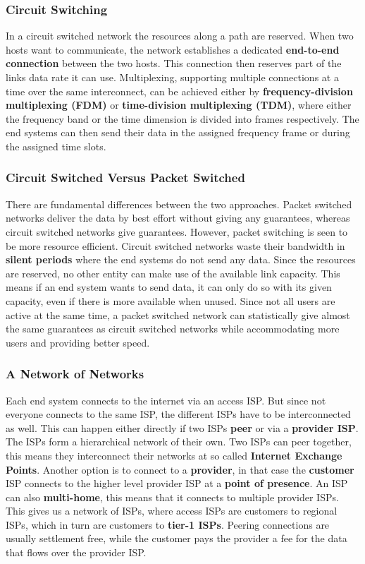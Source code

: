 \subsubsection{Circuit Switching}
In a circuit switched network the resources along a path are reserved. When two hosts want to communicate, the network establishes a dedicated \textbf{end-to-end connection} between the two hosts. This connection then reserves part of the links data rate it can use. Multiplexing, supporting multiple connections at a time over the same interconnect, can be achieved either by \textbf{frequency-division multiplexing (FDM)} or \textbf{time-division multiplexing (TDM)}, where either the frequency band or the time dimension is divided into frames respectively. The end systems can then send their data in the assigned frequency frame or during the assigned time slots.

\subsubsection{Circuit Switched Versus Packet Switched}
There are fundamental differences between the two approaches. Packet switched networks deliver the data by best effort without giving any guarantees, whereas circuit switched networks give guarantees. However, packet switching is seen to be more resource efficient. Circuit switched networks waste their bandwidth in \textbf{silent periods} where the end systems do not send any data. Since the resources are reserved, no other entity can make use of the available link capacity. This means if an end system wants to send data, it can only do so with its given capacity, even if there is more available when unused. Since not all users are active at the same time, a packet switched network can statistically give almost the same guarantees as circuit switched networks while accommodating more users and providing better speed. 

\subsubsection{A Network of Networks}
Each end system connects to the internet via an access ISP. But since not everyone connects to the same ISP, the different ISPs have to be interconnected as well. This can happen either directly if two ISPs \textbf{peer} or via a \textbf{provider ISP}. The ISPs form a hierarchical network of their own. Two ISPs can peer together, this means they interconnect their networks at so called \textbf{Internet Exchange Points}. Another option is to connect to a \textbf{provider}, in that case the \textbf{customer} ISP connects to the higher level provider ISP at a \textbf{point of presence}. An ISP can also \textbf{multi-home}, this means that it connects to multiple provider ISPs. This gives us a network of ISPs, where access ISPs are customers to regional ISPs, which in turn are customers to \textbf{tier-1 ISPs}. Peering connections are usually settlement free, while the customer pays the provider a fee for the data that flows over the provider ISP.

